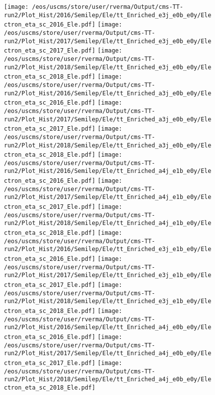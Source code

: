 \begin{figure}
\centering
\texttt{[image: /eos/uscms/store/user/rverma/Output/cms-TT-run2/Plot\_Hist/2016/Semilep/Ele/tt\_Enriched\_e3j\_e0b\_e0y/Electron\_eta\_sc\_2016\_Ele.pdf]}
\texttt{[image: /eos/uscms/store/user/rverma/Output/cms-TT-run2/Plot\_Hist/2017/Semilep/Ele/tt\_Enriched\_e3j\_e0b\_e0y/Electron\_eta\_sc\_2017\_Ele.pdf]}
\texttt{[image: /eos/uscms/store/user/rverma/Output/cms-TT-run2/Plot\_Hist/2018/Semilep/Ele/tt\_Enriched\_e3j\_e0b\_e0y/Electron\_eta\_sc\_2018\_Ele.pdf]}
\texttt{[image: /eos/uscms/store/user/rverma/Output/cms-TT-run2/Plot\_Hist/2016/Semilep/Ele/tt\_Enriched\_a3j\_e0b\_e0y/Electron\_eta\_sc\_2016\_Ele.pdf]}
\texttt{[image: /eos/uscms/store/user/rverma/Output/cms-TT-run2/Plot\_Hist/2017/Semilep/Ele/tt\_Enriched\_a3j\_e0b\_e0y/Electron\_eta\_sc\_2017\_Ele.pdf]}
\texttt{[image: /eos/uscms/store/user/rverma/Output/cms-TT-run2/Plot\_Hist/2018/Semilep/Ele/tt\_Enriched\_a3j\_e0b\_e0y/Electron\_eta\_sc\_2018\_Ele.pdf]}
\texttt{[image: /eos/uscms/store/user/rverma/Output/cms-TT-run2/Plot\_Hist/2016/Semilep/Ele/tt\_Enriched\_a4j\_e1b\_e0y/Electron\_eta\_sc\_2016\_Ele.pdf]}
\texttt{[image: /eos/uscms/store/user/rverma/Output/cms-TT-run2/Plot\_Hist/2017/Semilep/Ele/tt\_Enriched\_a4j\_e1b\_e0y/Electron\_eta\_sc\_2017\_Ele.pdf]}
\texttt{[image: /eos/uscms/store/user/rverma/Output/cms-TT-run2/Plot\_Hist/2018/Semilep/Ele/tt\_Enriched\_a4j\_e1b\_e0y/Electron\_eta\_sc\_2018\_Ele.pdf]}
\texttt{[image: /eos/uscms/store/user/rverma/Output/cms-TT-run2/Plot\_Hist/2016/Semilep/Ele/tt\_Enriched\_e3j\_e1b\_e0y/Electron\_eta\_sc\_2016\_Ele.pdf]}
\texttt{[image: /eos/uscms/store/user/rverma/Output/cms-TT-run2/Plot\_Hist/2017/Semilep/Ele/tt\_Enriched\_e3j\_e1b\_e0y/Electron\_eta\_sc\_2017\_Ele.pdf]}
\texttt{[image: /eos/uscms/store/user/rverma/Output/cms-TT-run2/Plot\_Hist/2018/Semilep/Ele/tt\_Enriched\_e3j\_e1b\_e0y/Electron\_eta\_sc\_2018\_Ele.pdf]}
\texttt{[image: /eos/uscms/store/user/rverma/Output/cms-TT-run2/Plot\_Hist/2016/Semilep/Ele/tt\_Enriched\_a4j\_e0b\_e0y/Electron\_eta\_sc\_2016\_Ele.pdf]}
\texttt{[image: /eos/uscms/store/user/rverma/Output/cms-TT-run2/Plot\_Hist/2017/Semilep/Ele/tt\_Enriched\_a4j\_e0b\_e0y/Electron\_eta\_sc\_2017\_Ele.pdf]}
\texttt{[image: /eos/uscms/store/user/rverma/Output/cms-TT-run2/Plot\_Hist/2018/Semilep/Ele/tt\_Enriched\_a4j\_e0b\_e0y/Electron\_eta\_sc\_2018\_Ele.pdf]}
\end{figure}

